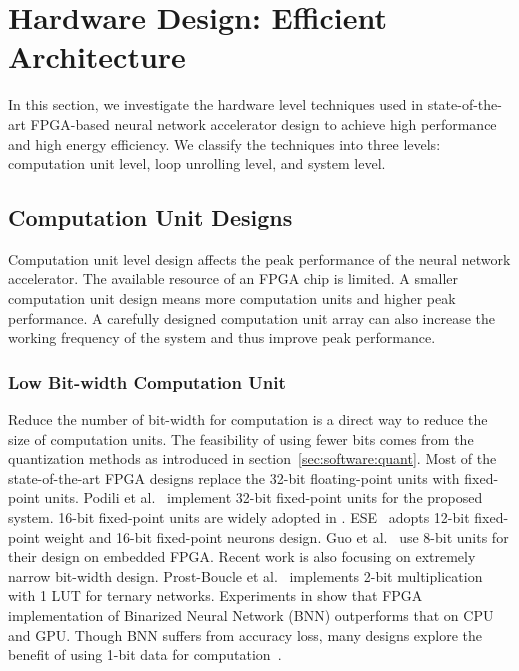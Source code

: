 \section{Hardware Design: Efficient Architecture}\label{sec:hardware}

In this section, we investigate the hardware level techniques used in state-of-the-art FPGA-based neural network accelerator design to achieve high performance and high energy efficiency. We classify the techniques into three levels: computation unit level, loop unrolling level, and system level.

\subsection{Computation Unit Designs}\label{sec:hardware:cu}

Computation unit level design affects the peak performance of the neural network accelerator. The available resource of an FPGA chip is limited. A smaller computation unit design means more computation units and higher peak performance. A carefully designed computation unit array can also increase the working frequency of the system and thus improve peak performance.

\subsubsection{Low Bit-width Computation Unit}\label{sec:hardware:cu:lbu}
Reduce the number of bit-width for computation is a direct way to reduce the size of computation units. The feasibility of using fewer bits comes from the quantization methods as introduced in section~\ref{sec:software:quant}. Most of the state-of-the-art FPGA designs replace the 32-bit floating-point units with fixed-point units. Podili et al.~\cite{podili2017fast} implement 32-bit fixed-point units for the proposed system. 16-bit fixed-point units are widely adopted in \cite{qiu2016going, li2016high, xiao2017exploring, guan2017fp, zhang2016caffeine}. ESE~\cite{han2017ese} adopts 12-bit fixed-point weight and 16-bit fixed-point neurons design. Guo et al.~\cite{guo2017angel} use 8-bit units for their design on embedded FPGA. Recent work is also focusing on extremely narrow bit-width design. Prost-Boucle et al.~\cite{prost2017scalable} implements 2-bit multiplication with 1 LUT for ternary networks. Experiments in \cite{nurvitadhi2016accelerating} show that FPGA implementation of Binarized Neural Network (BNN) outperforms that on CPU and GPU. Though BNN suffers from accuracy loss, many designs explore the benefit of using 1-bit data for computation~\cite{li20177, nakahara2017batch, zhao2017accelerating, umuroglu2017finn, nakahara2017fully, jiao2017accelerating, moss2017high, yang2018fully, ghasemzadehrebnet}.

